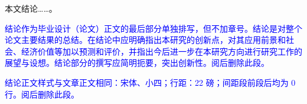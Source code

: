 
\begin{conclusion}

  本文结论……\cite{张伯伟2002全唐五代诗格会考}。

  \textcolor{blue}{结论作为毕业设计（论文）正文的最后部分单独排写，但不加章号。结论是对整个论文主要结果的总结。在结论中应明确指出本研究的创新点，对其应用前景和社会、经济价值等加以预测和评价，并指出今后进一步在本研究方向进行研究工作的展望与设想。结论部分的撰写应简明扼要，突出创新性。阅后删除此段。}

  \textcolor{blue}{结论正文样式与文章正文相同：宋体、小四；行距：22 磅；间距段前段后均为 0 行。阅后删除此段。}
\end{conclusion}

